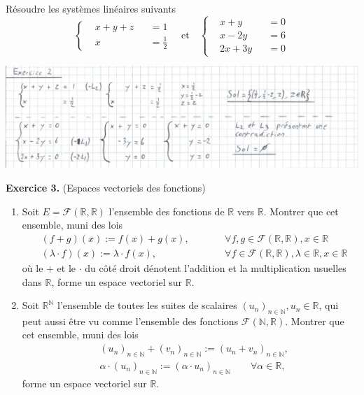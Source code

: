 \documentclass[a4paper, 10pt]{report}
\begin{document}
	\indent Résoudre les systèmes linéaires suivants
	\begin{equation*}
		\left\{
		\begin{aligned}
			&x + y + z & &= 1\\
			&x & &= \frac{1}{2}
		\end{aligned}
		\right.
		\quad \text{et} \quad
		\left\{
		\begin{aligned}
			&x + y & &= 0\\
			&x -2y & &= 6\\
			&2x + 3y & &= 0
		\end{aligned}
		\right.
	\end{equation*}
	
	\includegraphics{ex02.png}

	\vspace{5mm}
	\noindent \textbf{Exercice 3.} (Espaces vectoriels des fonctions)
	
	\begin{enumerate}[label=\arabic*.]
		\item Soit $E = \mathcal{F}(\mathbb{R}, \mathbb{R})$ l'ensemble des fonctions de $\mathbb{R}$ vers $\mathbb{R}$. Montrer que cet ensemble, muni des lois
		\begin{equation*}
		\begin{aligned}
		&(f + g)(x) := f(x) + g(x),
		\qquad
		& &\forall f, g \in \mathcal{F}(\mathbb{R}, \mathbb{R}), x \in \mathbb{R}\\
		&(\lambda \cdot f)(x) := \lambda \cdot f(x),
		\qquad
		& &\forall f \in \mathcal{F}(\mathbb{R}, \mathbb{R}), \lambda \in \mathbb{R}, x \in \mathbb{R}
		\end{aligned}
		\end{equation*}
		où le $+$ et le $\cdot$ du côté droit dénotent l'addition et la multiplication usuelles dans $\mathbb{R}$, forme un espace vectoriel sur $\mathbb{R}$.
		
		\item Soit $\mathbb{R}^{\mathbb{N}}$ l'ensemble de toutes les suites de scalaires $(u_n)_{n \in \mathbb{N}}, u_n \in \mathbb{R}$, qui peut aussi être vu comme l'ensemble des fonctions $\mathcal{F}(\mathbb{N}, \mathbb{R})$. Montrer que cet ensemble, muni des lois
		\begin{equation*}
			\begin{aligned}
				&(u_n)_{n \in \mathbb{N}} + (v_n)_{n \in \mathbb{N}} := (u_n + v_n)_{n \in \mathbb{N}},\\
				&\alpha \cdot (u_n)_{n \in \mathbb{N}} := (\alpha \cdot u_n)_{n \in \mathbb{N}}
				\qquad \forall \alpha \in \mathbb{R},
			\end{aligned}
		\end{equation*}
		forme un espace vectoriel sur $\mathbb{R}$.
	\end{enumerate}
	
\end{document}
